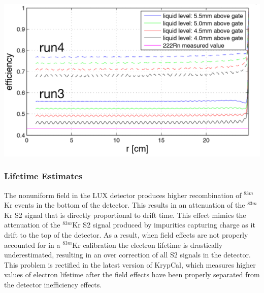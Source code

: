 \documentclass[a4paper,12pt]{article}
\begin{document}
{\begin{center}
\includegraphics[scale=0.5]{Run04Corrections/GuschinEE.png}
 \label{EEexpec}
\end{center}


\subsubsection{Lifetime Estimates}

The nonuniform field in the LUX detector produces higher recombination of $^{83m}$Kr events in the bottom of the detector.  This results in an attenuation of the $^{83m}$Kr S2 signal that is directly proportional to drift time.  This effect mimics the attenuation of the $^{83m}$Kr S2 signal produced by impurities capturing charge as it drift to the top of the detector.  As a result, when field effects are not properly accounted for in a $^{83m}$Kr calibration the electron lifetime is drastically underestimated, resulting in an over correction of all S2 signals in the detector.  This problem is rectified in the latest version of KrypCal, which measures higher values of electron lifetime after the field effects have been properly separated from the detector inefficiency effects.


}
\end{document}
